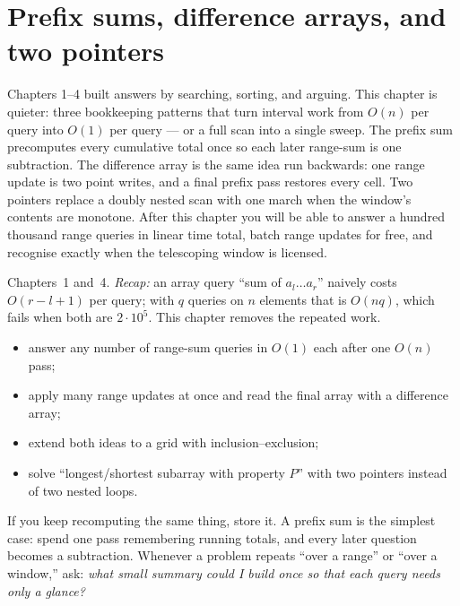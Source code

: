 \chapter{Prefix sums, difference arrays, and two pointers}\label{ch:prefix}

Chapters 1--4 built answers by searching, sorting, and arguing. This
chapter is quieter: three bookkeeping patterns that turn interval work
from $O(n)$ per query into $O(1)$ per query --- or a full scan into a
single sweep. The prefix sum precomputes every cumulative total once so
each later range-sum is one subtraction. The difference array is the
same idea run backwards: one range update is two point writes, and a
final prefix pass restores every cell. Two pointers replace a doubly
nested scan with one march when the window's contents are monotone.
After this chapter you will be able to answer a hundred thousand range
queries in linear time total, batch range updates for free, and
recognise exactly when the telescoping window is licensed.

\begin{rulebox}
Chapters~1 and~4. \emph{Recap:} an array query ``sum of $a_l\dots a_r$'' naively costs $O(r-l+1)$ per query; with $q$ queries on $n$ elements that is $O(nq)$, which fails when both are $2\cdot10^5$. This chapter removes the repeated work.
\end{rulebox}
\begin{wins}
\begin{itemize}
\item answer any number of range-sum queries in $O(1)$ each after one $O(n)$ pass;
\item apply many range updates at once and read the final array with a difference array;
\item extend both ideas to a grid with inclusion--exclusion;
\item solve ``longest/shortest subarray with property $P$'' with two pointers instead of two nested loops.
\end{itemize}
\end{wins}
\begin{principle}
If you keep recomputing the same thing, store it. A prefix sum is the simplest case: spend one pass remembering running totals, and every later question becomes a subtraction. Whenever a problem repeats ``over a range'' or ``over a window,'' ask: \emph{what small summary could I build once so that each query needs only a glance?}
\end{principle}

